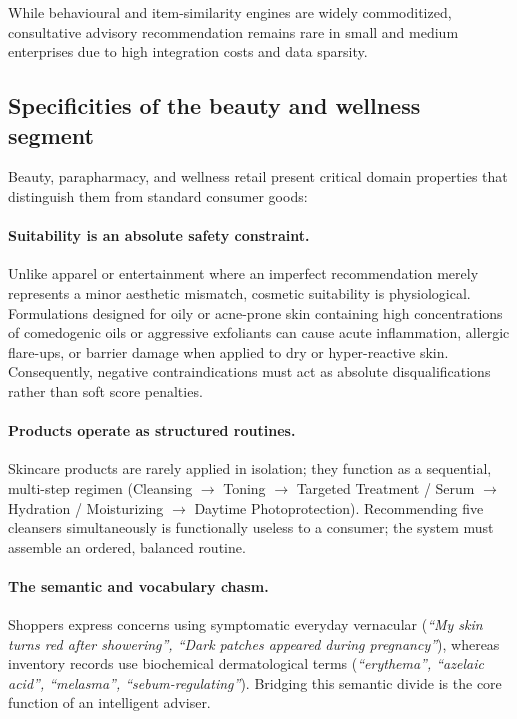 While behavioural and item-similarity engines are widely commoditized, consultative advisory recommendation remains rare in small and medium enterprises due to high integration costs and data sparsity.

\subsection{Specificities of the beauty and wellness segment}

Beauty, parapharmacy, and wellness retail present critical domain properties that distinguish them from standard consumer goods:

\paragraph{Suitability is an absolute safety constraint.} Unlike apparel or entertainment where an imperfect recommendation merely represents a minor aesthetic mismatch, cosmetic suitability is physiological. Formulations designed for oily or acne-prone skin containing high concentrations of comedogenic oils or aggressive exfoliants can cause acute inflammation, allergic flare-ups, or barrier damage when applied to dry or hyper-reactive skin. Consequently, negative contraindications must act as absolute disqualifications rather than soft score penalties.

\paragraph{Products operate as structured routines.} Skincare products are rarely applied in isolation; they function as a sequential, multi-step regimen (Cleansing $\rightarrow$ Toning $\rightarrow$ Targeted Treatment / Serum $\rightarrow$ Hydration / Moisturizing $\rightarrow$ Daytime Photoprotection). Recommending five cleansers simultaneously is functionally useless to a consumer; the system must assemble an ordered, balanced routine.

\paragraph{The semantic and vocabulary chasm.} Shoppers express concerns using symptomatic everyday vernacular (\emph{``My skin turns red after showering'', ``Dark patches appeared during pregnancy''}), whereas inventory records use biochemical dermatological terms (\emph{``erythema'', ``azelaic acid'', ``melasma'', ``sebum-regulating''}). Bridging this semantic divide is the core function of an intelligent adviser.

